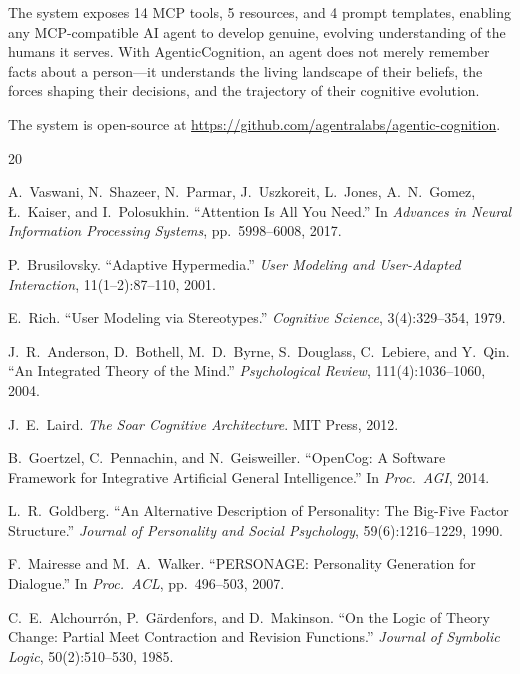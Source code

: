 \documentclass[10pt, twocolumn]{article}
\begin{document}
The system exposes 14 MCP tools, 5 resources, and 4 prompt templates, enabling any MCP-compatible AI agent to develop genuine, evolving understanding of the humans it serves. With AgenticCognition, an agent does not merely remember facts about a person---it understands the living landscape of their beliefs, the forces shaping their decisions, and the trajectory of their cognitive evolution.

The system is open-source at \url{https://github.com/agentralabs/agentic-cognition}.

\begin{thebibliography}{20}

A.~Vaswani, N.~Shazeer, N.~Parmar, J.~Uszkoreit, L.~Jones, A.~N.~Gomez, {\L}.~Kaiser, and I.~Polosukhin. ``Attention Is All You Need.'' In \textit{Advances in Neural Information Processing Systems}, pp.~5998--6008, 2017.

P.~Brusilovsky. ``Adaptive Hypermedia.'' \textit{User Modeling and User-Adapted Interaction}, 11(1--2):87--110, 2001.

E.~Rich. ``User Modeling via Stereotypes.'' \textit{Cognitive Science}, 3(4):329--354, 1979.

J.~R.~Anderson, D.~Bothell, M.~D.~Byrne, S.~Douglass, C.~Lebiere, and Y.~Qin. ``An Integrated Theory of the Mind.'' \textit{Psychological Review}, 111(4):1036--1060, 2004.

J.~E.~Laird. \textit{The Soar Cognitive Architecture}. MIT Press, 2012.

B.~Goertzel, C.~Pennachin, and N.~Geisweiller. ``OpenCog: A Software Framework for Integrative Artificial General Intelligence.'' In \textit{Proc.\ AGI}, 2014.

L.~R.~Goldberg. ``An Alternative Description of Personality: The Big-Five Factor Structure.'' \textit{Journal of Personality and Social Psychology}, 59(6):1216--1229, 1990.

F.~Mairesse and M.~A.~Walker. ``PERSONAGE: Personality Generation for Dialogue.'' In \textit{Proc.\ ACL}, pp.~496--503, 2007.

C.~E.~Alchourr{\'o}n, P.~G{\"a}rdenfors, and D.~Makinson. ``On the Logic of Theory Change: Partial Meet Contraction and Revision Functions.'' \textit{Journal of Symbolic Logic}, 50(2):510--530, 1985.


\end{thebibliography}
\end{document}
